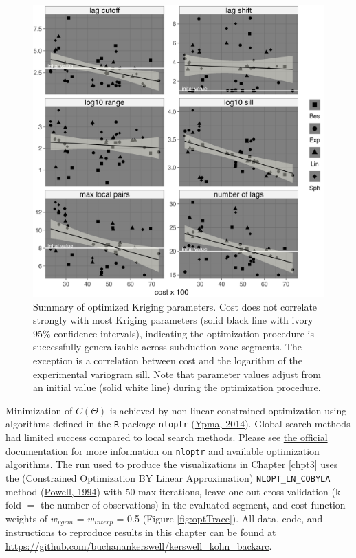 \begin{figure}[htbp]

{\centering \includegraphics[width=1\linewidth,]{assets/figs/chpt3/vgrmSummary} 

}

\caption[Summary of optimized variogram models]{Summary of optimized Kriging parameters. Cost does not correlate strongly with most Kriging parameters (solid black line with ivory 95\% confidence intervals), indicating the optimization procedure is successfully generalizable across subduction zone segments. The exception is a correlation between cost and the logarithm of the experimental variogram sill. Note that parameter values adjust from an initial value (solid white line) during the optimization procedure.}\label{fig:vgrmSummaryPlot}
\end{figure}

Minimization of \(C(\Theta)\) is achieved by non-linear constrained optimization using algorithms defined in the \texttt{R} package \texttt{nloptr} (\protect\hyperlink{ref-ypma2014}{Ypma, 2014}). Global search methods had limited success compared to local search methods. Please see \href{https://nlopt.readthedocs.io/en/latest/NLopt_Introduction/}{the official documentation} for more information on \texttt{nloptr} and available optimization algorithms. The run used to produce the visualizations in Chapter \ref{chpt3} uses the (Constrained Optimization BY Linear Approximation) \texttt{NLOPT\_LN\_COBYLA} method (\protect\hyperlink{ref-powell1994}{Powell, 1994}) with 50 max iterations, leave-one-out cross-validation (k-fold \(=\) the number of observations) in the evaluated segment, and cost function weights of \(w_{vgrm}\) = \(w_{interp}\) = 0.5 (Figure \ref{fig:optTrace}). All data, code, and instructions to reproduce results in this chapter can be found at \url{https://github.com/buchanankerswell/kerswell_kohn_backarc}.



